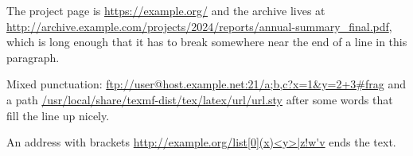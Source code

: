 \documentclass{article}
\begin{document}
The project page is \url{https://example.org/} and the archive lives at
\url{http://archive.example.com/projects/2024/reports/annual-summary_final.pdf}, which is long
enough that it has to break somewhere near the end of a line in this paragraph.

Mixed punctuation: \url{ftp://user@host.example.net:21/a;b,c?x=1&y=2+3#frag} and a path
\url{/usr/local/share/texmf-dist/tex/latex/url/url.sty} after some words that fill the line up nicely.

An address with brackets \url{http://example.org/list[0](x)<y>|z!w'v} ends the text.
\end{document}
